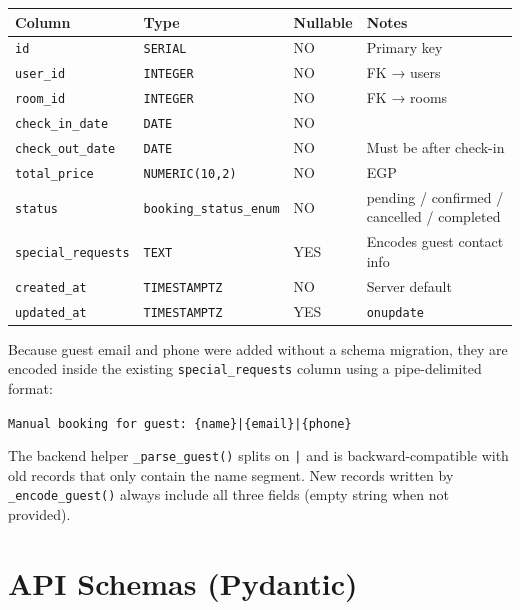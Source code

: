 \documentclass[12pt,a4paper]{report}
\begin{document}
\begin{center}
\begin{tabular}{llll}
  \toprule
  \textbf{Column} & \textbf{Type} & \textbf{Nullable} & \textbf{Notes} \\
  \midrule
  \texttt{id}               & \texttt{SERIAL}              & NO  & Primary key \\
  \texttt{user\_id}         & \texttt{INTEGER}             & NO  & FK → users \\
  \texttt{room\_id}         & \texttt{INTEGER}             & NO  & FK → rooms \\
  \texttt{check\_in\_date}  & \texttt{DATE}                & NO  & \\
  \texttt{check\_out\_date} & \texttt{DATE}                & NO  & Must be after check-in \\
  \texttt{total\_price}     & \texttt{NUMERIC(10,2)}       & NO  & EGP \\
  \texttt{status}           & \texttt{booking\_status\_enum} & NO & pending / confirmed / cancelled / completed \\
  \texttt{special\_requests}& \texttt{TEXT}                & YES & Encodes guest contact info \\
  \texttt{created\_at}      & \texttt{TIMESTAMPTZ}         & NO  & Server default \\
  \texttt{updated\_at}      & \texttt{TIMESTAMPTZ}         & YES & \texttt{onupdate} \\
  \bottomrule
\end{tabular}
\end{center}

\begin{infobox}[title=Guest Contact Encoding]
  Because guest email and phone were added without a schema migration, they are
  encoded inside the existing \texttt{special\_requests} column using a
  pipe-delimited format:

  \begin{center}
    \texttt{Manual booking for guest: \{name\}|\{email\}|\{phone\}}
  \end{center}

  The backend helper \texttt{\_parse\_guest()} splits on \texttt{|} and is
  backward-compatible with old records that only contain the name segment.
  New records written by \texttt{\_encode\_guest()} always include all three
  fields (empty string when not provided).
\end{infobox}

\section{API Schemas (Pydantic)}
\end{document}
